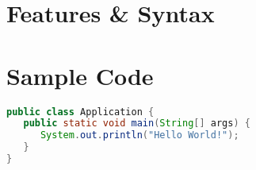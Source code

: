 \documentclass[12pt]{article}
\begin{document}
\section{Features \& Syntax}

\section{Sample Code}
\begin{lstlisting}[language=Java]
public class Application {
   public static void main(String[] args) {
      System.out.println("Hello World!");
   }
}
\end{lstlisting}
\end{document}
